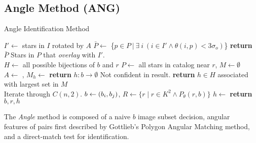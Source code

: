 \subsection{Angle Method (ANG)}\label{subsec:angleMethod}
\newcommand{\invalidBijection}{\If{$\forall \ \vv{b^\star}, \ \vv{b^\star} \in b \land h\left(\vv{b^\star}\right)
\neq \emptyset$}}
\begin{algorithm}
    \caption{Angle Identification Method} \label{algorithm:angleIdentification}
    \begin{algorithmic}[1]
        \State $I' \gets$ stars in $I$ rotated by $A$
        \State $\bar{P} \gets $ \{$p \in P \ | \ \exists \ i \ (i \in I' \land \theta (i, p) < 3\sigma_o)$\}
        \State \textbf{return} $\bar{P}$ \Comment Stars in $P$ that \textit{overlay} with $I'$.
        \EndFunction
        \\
        \State $H \gets $ all possible bijections of $b$ and $r$
        \State $P \gets $ all stars in catalog near $r$, $M \gets \emptyset$
        \State $A \gets $ , $M_h \gets $ 
        \EndFor
        \State \textbf{return} $h : b \rightarrow \emptyset $ \Comment Not confident in result.
        \Else
        \State \textbf{return} $h \in H$ associated with largest set in $M$
        \EndIf
        \EndFunction
        \\
         \Comment Iterate through $C(n, 2)$.
        \State $b \gets \left(b_i, b_j\right)$, $R \gets \{ r \mid r \in K^2 \land P_\theta(r, b) \}$
        \State $h \gets $  %
        \invalidBijection
        \State \textbf{return} $b, r, h$
        \EndIf
        \EndIf
        \EndFor
        \EndFor
        \EndFunction
    \end{algorithmic}
\end{algorithm}

The \textit{Angle} method is composed of a naive $b$ image subset decision, angular features of pairs first described by
Gottlieb's Polygon Angular Matching method, and a direct-match test for identification.

